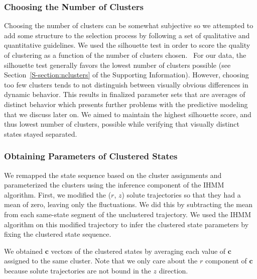 \documentclass[journal=jpcbfk,manuscript=article]{achemso}
\begin{document}
  \subsubsection*{Choosing the Number of Clusters}

  Choosing the number of clusters can be somewhat subjective so
  we attempted to add some structure to the selection process by following
  a set of qualitative and quantitative guidelines. We used the silhouette 
  test in order to score the quality of clustering as a function of the number 
  of clusters chosen.~\cite{kaufman_finding_2009} For our data, the silhouette 
  test generally favors the lowest number of clusters possible (see 
  Section~\ref{S-section:nclusters} of the Supporting Information). However, 
  choosing too few clusters tends to not distinguish between visually obvious 
  differences in dynamic behavior. This results in finalized parameter sets 
  that are averages of distinct behavior which presents further problems with 
  the predictive modeling that we discuss later on. We aimed to maintain the 
  highest silhouette score, and thus lowest number of clusters, possible while
  verifying that visually distinct states stayed separated. 
  

  \subsubsection*{Obtaining Parameters of Clustered States}
  
  We remapped the state sequence based on the cluster assignments and parameterized
  the clusters using the inference component of the IHMM algorithm. 
  First, we modified the ($r$, $z$) solute trajectories so that they had a mean of zero,
  leaving only the fluctuations. We did this by subtracting the mean from each 
  same-state segment of the unclustered trajectory. We used the IHMM algorithm on this
  modified trajectory to infer the clustered state parameters by fixing the clustered 
  state sequence. 
  
  We obtained $\mathbf{c}$ vectors of the clustered states by averaging 
  each value of $\mathbf{c}$ assigned to the same cluster. Note that we only care
  about the $r$ component of $\mathbf{c}$ because solute trajectories are not 
  bound in the $z$ direction.
\end{document}
